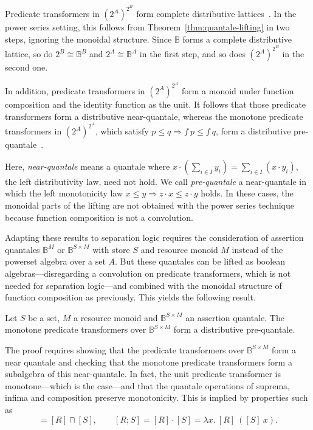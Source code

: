 \documentclass[twoside,runningheads,envcountsame,envcountsect,oribibl,orivec]{llncs}
\begin{document}
Predicate transformers in $(2^A)^{2^B}$ form complete distributive
lattices~\cite{BvW99-book}. In the power series setting, this follows
from Theorem~\ref{thm:quantale-lifting} in two steps, ignoring the
monoidal structure. Since $\mathbb{B}$ forms a complete distributive
lattice, so do $2^B\cong \mathbb{B}^B$ and $2^A\cong\mathbb{B}^A$ in
the first step, and so does $(2^A)^{2^B}$ in the second one.

In addition, predicate transformers in $(2^A)^{2^A}$ form a monoid
under function composition and the identity function as the unit.  It
follows that those predicate transformers form a distributive
near-quantale, whereas the monotone predicate transformers in
$(2^A)^{2^A}$, which satisfy $p\le q\Rightarrow f\ p\le f\ q$, form a
distributive pre-quantale~\cite{BvW99-book}.

Here, \emph{near-quantale} means a quantale where $x\cdot (\sum_{i\in
  I}y_i) = \sum_{i\in I} (x\cdot y_i)$, the left distributivity law,
need not hold. We call \emph{pre-quantale} a near-quantale in which
the left monotonicity law $x\le y\Rightarrow z\cdot x\le z\cdot y$
holds. In these cases, the monoidal parts of the lifting are not
obtained with the power series technique because function composition
is not a convolution.

Adapting these results to separation logic requires the consideration
of assertion quantales $\mathbb{B}^M$ or $\mathbb{B}^{S\times M}$ with
store $S$ and resource monoid $M$ instead of the powerset algebra over
a set $A$. But these quantales can be lifted as boolean
algebras---disregarding a convolution on predicate transformers, which
is not needed for separation logic---and combined with the monoidal
structure of function composition as previously. This yields the
following result.
\begin{theorem}\label{thm:sep-pt-quantales}
  Let $S$ be a set, $M$ a resource monoid and $\mathbb{B}^{S\times M}$
  an assertion quantale. The monotone predicate transformers over
  $\mathbb{B}^{S\times M}$ form a distributive pre-quantale.
\end{theorem}
The proof requires showing that the predicate transformers over
$\mathbb{B}^{S\times M}$ form a near quantale and checking that the
monotone predicate transformers form a subalgebra of this
near-quantale. In fact, the unit predicate transformer is
monotone---which is the case---and that the quantale operations of
suprema, infima and composition preserve monotonicity. This is implied
by properties such as
\begin{equation*}
[R\cup S] = [R] \sqcap [S],\qquad [R;S]= [R]\cdot [S] = \lambda x.\ [R]\ ([S]\ x).
\end{equation*}
\end{document}
